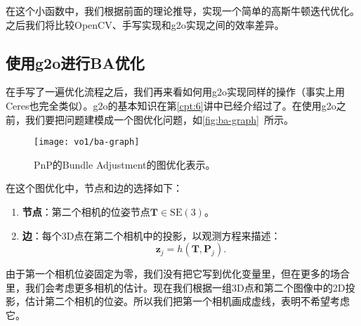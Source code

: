 在这个小函数中，我们根据前面的理论推导，实现一个简单的高斯牛顿迭代优化。之后我们将比较OpenCV、手写实现和g2o实现之间的效率差异。

\subsection{使用g2o进行BA优化}
在手写了一遍优化流程之后，我们再来看如何用g2o实现同样的操作（事实上用Ceres也完全类似）。g2o的基本知识在第\ref{cpt:6}讲中已经介绍过了。在使用g2o之前，我们要把问题建模成一个图优化问题，如\autoref{fig:ba-graph}~所示。

\begin{figure}[!htp]
	\centering
	\texttt{[image: vo1/ba-graph]}
	\caption{PnP的Bundle Adjustment的图优化表示。}
	\label{fig:ba-graph}
\end{figure}

在这个图优化中，节点和边的选择如下：
\begin{enumerate}
	\item \textbf{节点}：第二个相机的位姿节点$\bm{T} \in \mathrm{SE}(3)$。
	\item \textbf{边}：每个3D点在第二个相机中的投影，以观测方程来描述：
	\[
	\bm{z}_j = h(\bm{T}, \bm{P}_{j}).
	\]
\end{enumerate}

由于第一个相机位姿固定为零，我们没有把它写到优化变量里，但在更多的场合里，我们会考虑更多相机的估计。现在我们根据一组3D点和第二个图像中的2D投影，估计第二个相机的位姿。所以我们把第一个相机画成虚线，表明不希望考虑它。

